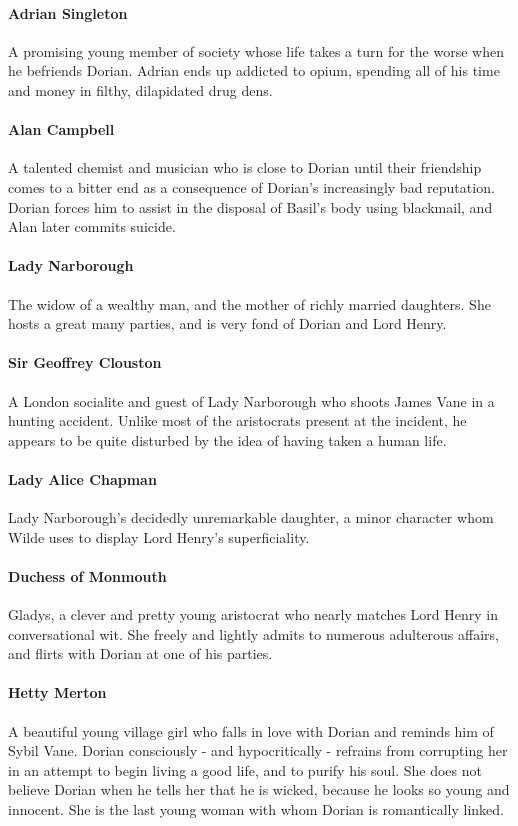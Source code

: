 \documentclass[12pt,twoside,titlepage,a4paper]{article}
\begin{document}
	\paragraph{Adrian Singleton} A promising young member of society whose life takes a turn for the worse when he befriends Dorian. Adrian ends up addicted to opium, spending all of his time and money in filthy, dilapidated drug dens.
	
	\paragraph{Alan Campbell} A talented chemist and musician who is close to Dorian until their friendship comes to a bitter end as a consequence of Dorian's increasingly bad reputation. Dorian forces him to assist in the disposal of Basil's body using blackmail, and Alan later commits suicide.
	
	\paragraph{Lady Narborough} The widow of a wealthy man, and the mother of richly married daughters. She hosts a great many parties, and is very fond of Dorian and Lord Henry.
	
	\paragraph{Sir Geoffrey Clouston} A London socialite and guest of Lady Narborough who shoots James Vane in a hunting accident. Unlike most of the aristocrats present at the incident, he appears to be quite disturbed by the idea of having taken a human life.
	
	\paragraph{Lady Alice Chapman} Lady Narborough's decidedly unremarkable daughter, a minor character whom Wilde uses to display Lord Henry's superficiality.
	
	\paragraph{Duchess of Monmouth} Gladys, a clever and pretty young aristocrat who nearly matches Lord Henry in conversational wit. She freely and lightly admits to numerous adulterous affairs, and flirts with Dorian at one of his parties.
	
	\paragraph{Hetty Merton} A beautiful young village girl who falls in love with Dorian and reminds him of Sybil Vane. Dorian consciously - and hypocritically - refrains from corrupting her in an attempt to begin living a good life, and to purify his soul. She does not believe Dorian when he tells her that he is wicked, because he looks so young and innocent. She is the last young woman with whom Dorian is romantically linked.
	
	
\end{document}
